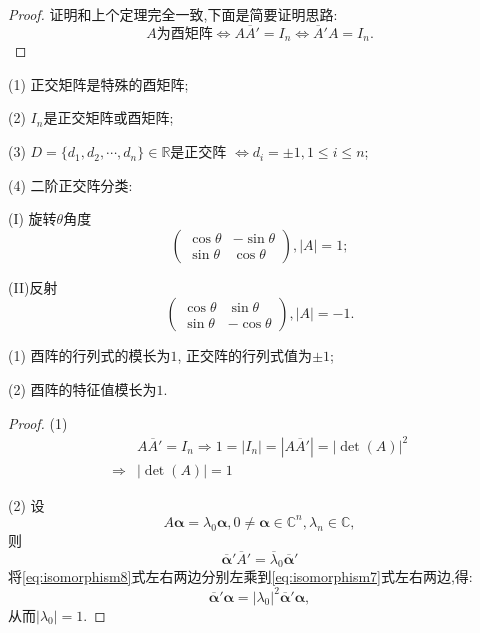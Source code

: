 \begin{proof}
  证明和上个定理完全一致,下面是简要证明思路:
  \[
  A\text{为酉矩阵} \Longleftrightarrow A\overline{A}'=I_n \Longleftrightarrow 
  \overline{A}'A=I_n.
  \]
\end{proof}

\begin{example}
  (1) 正交矩阵是特殊的酉矩阵;

  (2) $I_n$是正交矩阵或酉矩阵;

  (3) $D=\{d_1,d_2,\cdots,d_n\}\in \mathbb{R}$是正交阵 
  $ \Longleftrightarrow d_i=\pm 1, 1\leq i \leq n$;

  (4) 二阶正交阵分类:
  
  (I) 旋转$\theta$角度
  \[
  \begin{pmatrix}
    \cos\theta & -\sin\theta\\\sin\theta & \cos\theta
  \end{pmatrix}, |A| = 1;
  \] 
  
  (II)反射
  \[
  \begin{pmatrix}
    \cos\theta & \sin\theta\\ \sin\theta & -\cos\theta
  \end{pmatrix}, |A| = -1.
  \]
\end{example}

\begin{question}
  (1) 酉阵的行列式的模长为$1$,
  正交阵的行列式值为$\pm 1$;

  (2) 酉阵的特征值模长为$1$.
\end{question}

\begin{proof}
  (1)
  \begin{align*}
    & A\overline{A}'=I_n\Longrightarrow 1 = |I_n| = |A\overline{A}'| = |\det(A)|^2\\
    \Longrightarrow & |\det(A)|=1
  \end{align*}

  (2) 设
  \begin{equation}\label{eq:isomorphism7}
    A\bm{\alpha}=\lambda_0\bm{\alpha}, 0 \neq \bm{\alpha}\in \mathbb{C}^n, \lambda_n\in \mathbb{C},
  \end{equation}
  则
  \begin{equation}\label{eq:isomorphism8}
    \overline{\bm{\alpha}}'\overline{A}' = \overline{\lambda}_0\overline{\bm{\alpha}}'
  \end{equation}
  将\eqref{eq:isomorphism8}式左右两边分别左乘到\eqref{eq:isomorphism7}式左右两边,得:
  \begin{equation*}
    \overline{\bm{\alpha}}'\bm{\alpha} = |\lambda_0|^2\overline{\bm{\alpha}}'\bm{\alpha},
  \end{equation*}
  从而$|\lambda_0|=1$.
\end{proof}


